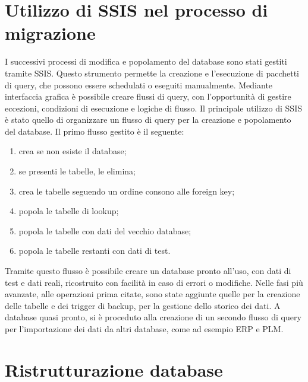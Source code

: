 \section{Utilizzo di SSIS nel processo di migrazione}
I successivi processi di modifica e popolamento del database sono stati gestiti tramite
\ac{SSIS}\cite{SQLServerIntegration}.
Questo strumento permette la creazione e l'esecuzione di pacchetti di query,
che possono essere schedulati o eseguiti manualmente.
Mediante interfaccia grafica è possibile creare flussi di query, con l'opportunità di gestire
eccezioni, condizioni di esecuzione e logiche di flusso.
Il principale utilizzo di \ac{SSIS} è stato quello di organizzare
un flusso di query per la creazione e popolamento del database.
Il primo flusso gestito è il seguente:
\begin{enumerate}
    \item crea se non esiste il database;
    \item se presenti le tabelle, le elimina;
    \item crea le tabelle seguendo un ordine consono alle foreign key;
    \item popola le tabelle di lookup;
    \item popola le tabelle con dati del vecchio database;
    \item popola le tabelle restanti con dati di test.
\end{enumerate}
Tramite questo flusso è possibile creare un database pronto all'uso, con dati di test e dati reali,
ricostruito con facilità in caso di errori o modifiche.
Nelle fasi più avanzate, alle operazioni prima citate, sono state aggiunte
quelle per la creazione delle tabelle e dei trigger di backup, per la gestione dello storico dei dati.
A database quasi pronto, si è proceduto alla creazione di un secondo flusso di query per
l'importazione dei dati da altri database, come ad esempio \ac{ERP} e \ac{PLM}.
\section{Ristrutturazione database}
